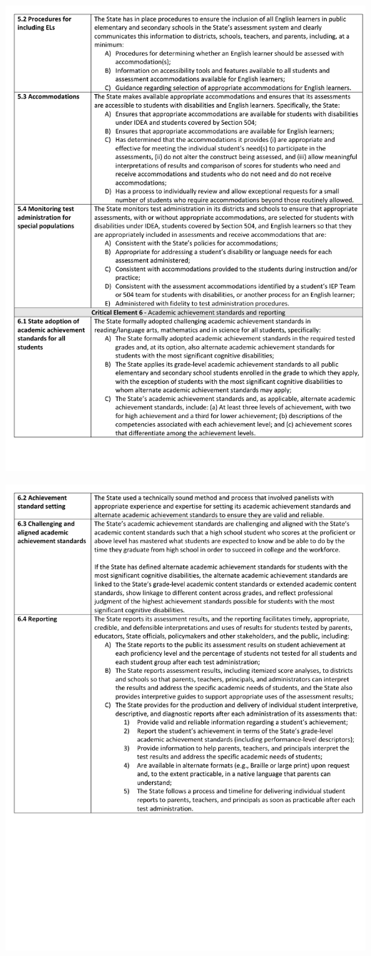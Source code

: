 \documentclass[]{book}
\begin{document}
\newpage

\includegraphics{figures/peer_rev/PeerReview5.pdf}

\newpage

\includegraphics{figures/peer_rev/PeerReview6.pdf}
\end{document}
